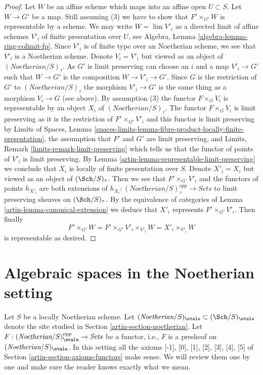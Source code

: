 \begin{proof}
\medskip\noindent
Let $W$ be an affine scheme which maps into an affine open $U \subset S$.
Let $W \to G'$ be a map.
Still assuming (3) we have to show that $F' \times_{G'} W$
is representable by a scheme.
We may write $W = \lim V'_i$ as a directed limit of affine
schemes $V'_i$ of finite presentation over $U$, see
Algebra, Lemma \ref{algebra-lemma-ring-colimit-fp}.
Since $V'_i$ is of finite type over an Noetherian scheme,
we see that $V'_i$ is a Noetherian scheme.
Denote $V_i = V'_i$ but viewed as an object of
$(\textit{Noetherian}/S)_\tau$. As $G'$
is limit preserving can choose an $i$ and a map
$V'_i \to G'$ such that $W \to G'$ is the composition
$W \to V'_i \to G'$. Since $G$ is the restriction of $G'$
to $(\textit{Noetherian}/S)_\tau$ the morphism $V'_i \to G'$
is the same thing as a morphism $V_i \to G$ (see above).
By assumption (3) the functor $F \times_G V_i$ is representable by an object
$X_i$ of $(\textit{Noetherian}/S)_\tau$.
The functor $F \times_G V_i$ is limit preserving
as it is the restriction of $F' \times_{G'} V'_i$
and this functor is limit preserving by
Limits of Spaces, Lemma
\ref{spaces-limits-lemma-fibre-product-locally-finite-presentation},
the assumption that $F'$ and $G'$ are limit preserving, and
Limits, Remark \ref{limits-remark-limit-preserving} which
tells us that the functor of points of $V'_i$ is limit preserving.
By Lemma \ref{artin-lemma-representable-limit-preserving}
we conclude that $X_i$ is locally of finite presentation over $S$.
Denote $X'_i = X_i$ but viewed as an object of
$(\Sch/S)_\tau$. Then we see that $F' \times_{G'} V'_i$
and the functors of points $h_{X'_i}$ are both extensions
of $h_{X_i} : (\textit{Noetherian}/S)_\tau^{opp} \to \textit{Sets}$
to limit preserving sheaves on $(\Sch/S)_\tau$.
By the equivalence of categories of Lemma \ref{artin-lemma-canonical-extension}
we deduce that $X'_i$ represents $F' \times_{G'} V'_i$.
Then finally
$$
F' \times_{G'} W = F' \times_{G'} V'_i \times_{V'_i} W =
X'_i \times_{V'_i} W
$$
is representable as desired.
\end{proof}

\section{Algebraic spaces in the Noetherian setting}
\label{artin-section-algebraic-spaces-noetherian}
Let $S$ be a locally Noetherian scheme. Let
$(\textit{Noetherian}/S)_\etale \subset (\Sch/S)_\etale$
denote the site studied in Section \ref{artin-section-noetherian}.
Let $F : (\textit{Noetherian}/S)_\etale^{opp} \to \textit{Sets}$
be a functor, i.e., $F$ is a presheaf on $(\textit{Noetherian}/S)_\etale$.
In this setting all the axioms [-1],  [0], [1], [2], [3], [4], [5] of
Section \ref{artin-section-axioms-functors} make sense. We will review them
one by one and make sure the reader knows exactly what we mean.

